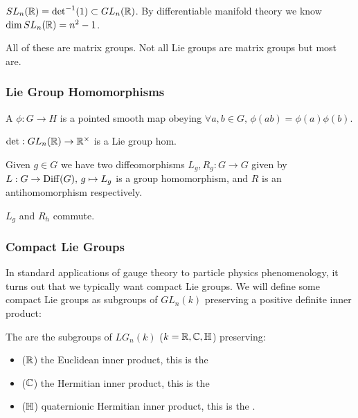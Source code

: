 \documentclass{article}
\begin{document}
\begin{example}
$SL_n(\mathbb{R}) = \det^{-1}(1) \subset GL_n(\mathbb{R})$. By differentiable manifold theory we know $\dim SL_n(\mathbb{R}) = n^2-1$. 
\end{example}



\begin{remark}
All of these are matrix groups. Not all Lie groups are matrix groups but most are. 
\end{remark}

\subsubsection{Lie Group Homomorphisms}

\begin{definition}
	A  $\phi:G \to H$ is a pointed smooth map obeying $\forall a,b \in G, \, \phi(ab) = \phi(a)\phi(b)$. 
\end{definition}

\begin{example}
	$\det : GL_n(\mathbb{R}) \to \mathbb{R}^\times$ is a Lie group hom. 
\end{example}

\begin{definition}
	Given $g \in G$ we have two diffeomorphisms $L_g, R_g : G \to G$ given by 
$L:G \to \operatorname{Diff}(G), \, g \mapsto L_g$ is a group homomorphism, and $R$ is an antihomomorphism respectively. 
\end{definition}

\begin{lemma}
	$L_g$ and $R_h$ commute. 
\end{lemma}
\subsubsection{Compact Lie Groups}
In standard applications of gauge theory to particle physics phenomenology, it turns out that we typically want compact Lie groups. We will define some compact Lie groups as subgroups of $GL_n(k)$ preserving a positive definite inner product:

\begin{definition}
	The  are the subgroups of $LG_n(k)$ ($k=\mathbb{R},\mathbb{C},\mathbb{H}$) preserving:
	\begin{itemize}
		\item ($\mathbb{R}$) the Euclidean inner product, this is the 
		\item ($\mathbb{C}$) the Hermitian inner product, this is the 
		\item ($\mathbb{H}$) quaternionic Hermitian inner product, this is the .
	\end{itemize} 
\end{definition} 
\end{document}
